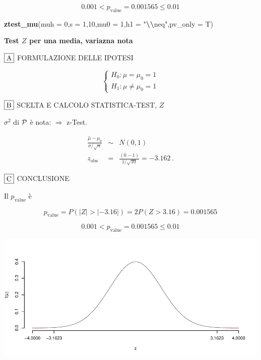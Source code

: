 \documentclass[
  11pt,
]{book}
\newenvironment{Shaded}{\begin{snugshade}}{\end{snugshade}}
\newcommand{\AttributeTok}[1]{\textcolor[rgb]{0.13,0.29,0.53}{#1}}
\newcommand{\DecValTok}[1]{\textcolor[rgb]{0.00,0.00,0.81}{#1}}
\newcommand{\FunctionTok}[1]{\textcolor[rgb]{0.13,0.29,0.53}{\textbf{#1}}}
\newcommand{\NormalTok}[1]{#1}
\newcommand{\SpecialCharTok}[1]{\textcolor[rgb]{0.81,0.36,0.00}{\textbf{#1}}}
\newcommand{\StringTok}[1]{\textcolor[rgb]{0.31,0.60,0.02}{#1}}
\theoremstyle{mytheoremstyle}
\theoremstyle{mydefstyle}
\begin{document}
\[
 0.001 < p_\text{value}= 0.001565 \leq 0.01 
\]

\begin{Shaded}
\begin{Highlighting}[]
\FunctionTok{ztest\_mu}\NormalTok{(}\AttributeTok{muh =} \DecValTok{0}\NormalTok{,}\AttributeTok{s =} \DecValTok{1}\NormalTok{,}\DecValTok{10}\NormalTok{,}\AttributeTok{mu0 =} \DecValTok{1}\NormalTok{,}\AttributeTok{h1 =} \StringTok{"}\SpecialCharTok{\textbackslash{}\textbackslash{}}\StringTok{neq"}\NormalTok{,}\AttributeTok{pv\_only =}\NormalTok{ T)}
\end{Highlighting}
\end{Shaded}

\textbf{Test \(Z\) per una media, variazna nota}

\(\fbox{A}\) FORMULAZIONE DELLE IPOTESI

\[\begin{cases}
   H_0: \mu = \mu_0=1 \\
   H_1: \mu \neq \mu_0=1 
   \end{cases}\]

\(\fbox{B}\) SCELTA E CALCOLO STATISTICA-TEST, \(Z\)

\(\sigma^{2}\) di \(\cal{P}\) è nota: \(\Rightarrow\) z-Test.

\begin{eqnarray*}
   \frac{\hat\mu - \mu_{0}} {\sigma/\sqrt{n}}&\sim&N(0,1)\\
   z_{\text{obs}}
   &=& \frac{ ( 0 -  1 )} { 1 /\sqrt{ 10 }}
   =   -3.162 \, .
   \end{eqnarray*}

\(\fbox{C}\) CONCLUSIONE

Il \(p_{\text{value}}\) è

\[ p_{\text{value}} = P(|Z|>|-3.16|)=2P(Z>3.16)=0.001565 \]

\[
 0.001 < p_\text{value}= 0.001565 \leq 0.01 
\]

\begin{center}\includegraphics{Appunti_di_Statistica_2025_files/figure-latex/25-test-functions-10-3} \end{center}
\end{document}
